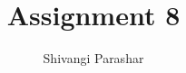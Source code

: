 \documentclass[journal,12pt,twocolumn]{IEEEtran}
\begin{document}
\makeatletter
{}
\makeatother
\let\StandardTheFigure\thefigure
\let\vec\mathbf
\renewcommand{\thefigure}{\theproblem}
\def\putbox#1#2#3{\makebox[0in][l]{\makebox[#1][l]{}\raisebox{\baselineskip}[0in][0in]{\raisebox{#2}[0in][0in]{#3}}}}
     \def\rightbox#1{\makebox[0in][r]{#1}}
     \def\centbox#1{\makebox[0in]{#1}}
     \def\topbox#1{\raisebox{-\baselineskip}[0in][0in]{#1}}
     \def\midbox#1{\raisebox{-0.5\baselineskip}[0in][0in]{#1}}
\vspace{3cm}
\title{Assignment 8}
\author{Shivangi Parashar}
%
%
%
% 
%
\end{document}

